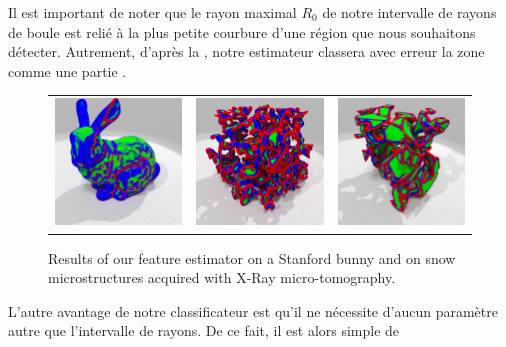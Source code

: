 Il est important de noter que le rayon maximal $R_0$ de notre intervalle de
rayons de boule est relié à la plus petite courbure d'une région \featsmooth
que nous souhaitons détecter. Autrement, d'après la
, notre estimateur classera avec erreur la zone
comme une partie \featflat.
%
%
%
\begin{figure}[ht]
  \begin{center}
    \setlength{\tabcolsep}{1pt}
    \begin{tabular}{c c c}
      \includegraphics[width=4cm]{images/Feature/Bunny_512_II_scale} &
      \includegraphics[width=4cm]{images/Feature/Snow_I08_II_scale} &
      \includegraphics[width=4cm]{images/Feature/Snow_E2bis_II_scale} \\
    \end{tabular}
    \caption{Results of our feature estimator on a Stanford bunny and on snow microstructures acquired with X-Ray micro-tomography.\label{fig:feature-snow}}
  \end{center}
\end{figure}
%
L'autre avantage de notre classificateur est qu'il ne nécessite d'aucun
paramètre autre que l'intervalle de rayons. De ce fait, il est alors simple de
